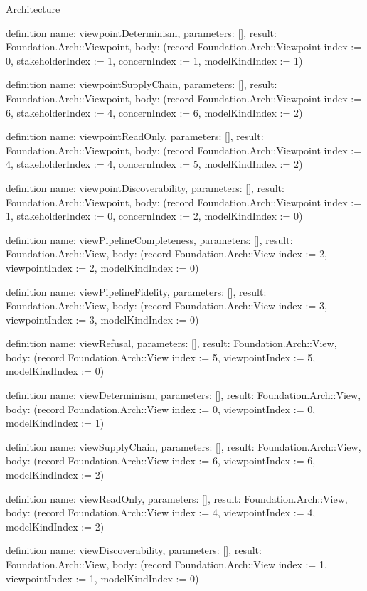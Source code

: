 \begin{lexlean}{Architecture}
\begin{semanticmodule}
definition{
  name: viewpointDeterminism,
  parameters: [],
  result: Foundation.Arch::Viewpoint,
  body: (record Foundation.Arch::Viewpoint {index := 0, stakeholderIndex := 1, concernIndex := 1, modelKindIndex := 1})
}

definition{
  name: viewpointSupplyChain,
  parameters: [],
  result: Foundation.Arch::Viewpoint,
  body: (record Foundation.Arch::Viewpoint {index := 6, stakeholderIndex := 4, concernIndex := 6, modelKindIndex := 2})
}

definition{
  name: viewpointReadOnly,
  parameters: [],
  result: Foundation.Arch::Viewpoint,
  body: (record Foundation.Arch::Viewpoint {index := 4, stakeholderIndex := 4, concernIndex := 5, modelKindIndex := 2})
}

definition{
  name: viewpointDiscoverability,
  parameters: [],
  result: Foundation.Arch::Viewpoint,
  body: (record Foundation.Arch::Viewpoint {index := 1, stakeholderIndex := 0, concernIndex := 2, modelKindIndex := 0})
}

definition{
  name: viewPipelineCompleteness,
  parameters: [],
  result: Foundation.Arch::View,
  body: (record Foundation.Arch::View {index := 2, viewpointIndex := 2, modelKindIndex := 0})
}

definition{
  name: viewPipelineFidelity,
  parameters: [],
  result: Foundation.Arch::View,
  body: (record Foundation.Arch::View {index := 3, viewpointIndex := 3, modelKindIndex := 0})
}

definition{
  name: viewRefusal,
  parameters: [],
  result: Foundation.Arch::View,
  body: (record Foundation.Arch::View {index := 5, viewpointIndex := 5, modelKindIndex := 0})
}

definition{
  name: viewDeterminism,
  parameters: [],
  result: Foundation.Arch::View,
  body: (record Foundation.Arch::View {index := 0, viewpointIndex := 0, modelKindIndex := 1})
}

definition{
  name: viewSupplyChain,
  parameters: [],
  result: Foundation.Arch::View,
  body: (record Foundation.Arch::View {index := 6, viewpointIndex := 6, modelKindIndex := 2})
}

definition{
  name: viewReadOnly,
  parameters: [],
  result: Foundation.Arch::View,
  body: (record Foundation.Arch::View {index := 4, viewpointIndex := 4, modelKindIndex := 2})
}

definition{
  name: viewDiscoverability,
  parameters: [],
  result: Foundation.Arch::View,
  body: (record Foundation.Arch::View {index := 1, viewpointIndex := 1, modelKindIndex := 0})
}


\end{semanticmodule}
\end{lexlean}
